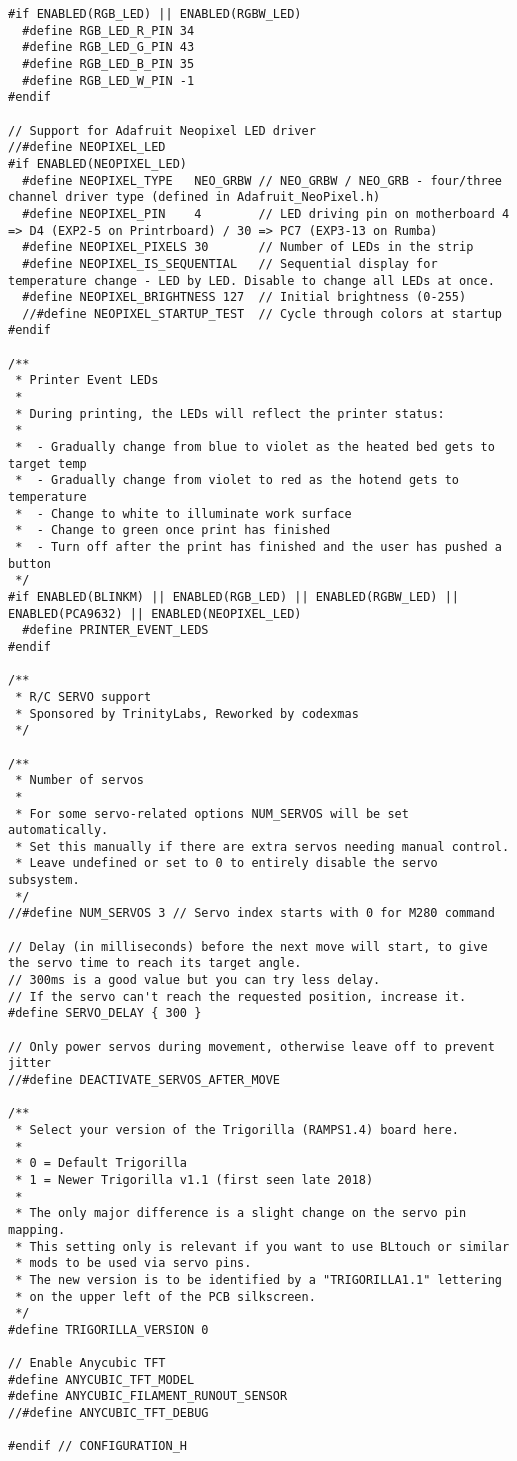 \begin{lstlisting}[caption = キャプション, label = ラベル]
#if ENABLED(RGB_LED) || ENABLED(RGBW_LED)
  #define RGB_LED_R_PIN 34
  #define RGB_LED_G_PIN 43
  #define RGB_LED_B_PIN 35
  #define RGB_LED_W_PIN -1
#endif

// Support for Adafruit Neopixel LED driver
//#define NEOPIXEL_LED
#if ENABLED(NEOPIXEL_LED)
  #define NEOPIXEL_TYPE   NEO_GRBW // NEO_GRBW / NEO_GRB - four/three channel driver type (defined in Adafruit_NeoPixel.h)
  #define NEOPIXEL_PIN    4        // LED driving pin on motherboard 4 => D4 (EXP2-5 on Printrboard) / 30 => PC7 (EXP3-13 on Rumba)
  #define NEOPIXEL_PIXELS 30       // Number of LEDs in the strip
  #define NEOPIXEL_IS_SEQUENTIAL   // Sequential display for temperature change - LED by LED. Disable to change all LEDs at once.
  #define NEOPIXEL_BRIGHTNESS 127  // Initial brightness (0-255)
  //#define NEOPIXEL_STARTUP_TEST  // Cycle through colors at startup
#endif

/**
 * Printer Event LEDs
 *
 * During printing, the LEDs will reflect the printer status:
 *
 *  - Gradually change from blue to violet as the heated bed gets to target temp
 *  - Gradually change from violet to red as the hotend gets to temperature
 *  - Change to white to illuminate work surface
 *  - Change to green once print has finished
 *  - Turn off after the print has finished and the user has pushed a button
 */
#if ENABLED(BLINKM) || ENABLED(RGB_LED) || ENABLED(RGBW_LED) || ENABLED(PCA9632) || ENABLED(NEOPIXEL_LED)
  #define PRINTER_EVENT_LEDS
#endif

/**
 * R/C SERVO support
 * Sponsored by TrinityLabs, Reworked by codexmas
 */

/**
 * Number of servos
 *
 * For some servo-related options NUM_SERVOS will be set automatically.
 * Set this manually if there are extra servos needing manual control.
 * Leave undefined or set to 0 to entirely disable the servo subsystem.
 */
//#define NUM_SERVOS 3 // Servo index starts with 0 for M280 command

// Delay (in milliseconds) before the next move will start, to give the servo time to reach its target angle.
// 300ms is a good value but you can try less delay.
// If the servo can't reach the requested position, increase it.
#define SERVO_DELAY { 300 }

// Only power servos during movement, otherwise leave off to prevent jitter
//#define DEACTIVATE_SERVOS_AFTER_MOVE

/**
 * Select your version of the Trigorilla (RAMPS1.4) board here.
 *
 * 0 = Default Trigorilla
 * 1 = Newer Trigorilla v1.1 (first seen late 2018)
 *
 * The only major difference is a slight change on the servo pin mapping.
 * This setting only is relevant if you want to use BLtouch or similar
 * mods to be used via servo pins.
 * The new version is to be identified by a "TRIGORILLA1.1" lettering
 * on the upper left of the PCB silkscreen.
 */
#define TRIGORILLA_VERSION 0

// Enable Anycubic TFT
#define ANYCUBIC_TFT_MODEL
#define ANYCUBIC_FILAMENT_RUNOUT_SENSOR
//#define ANYCUBIC_TFT_DEBUG

#endif // CONFIGURATION_H

 \end{lstlisting}


